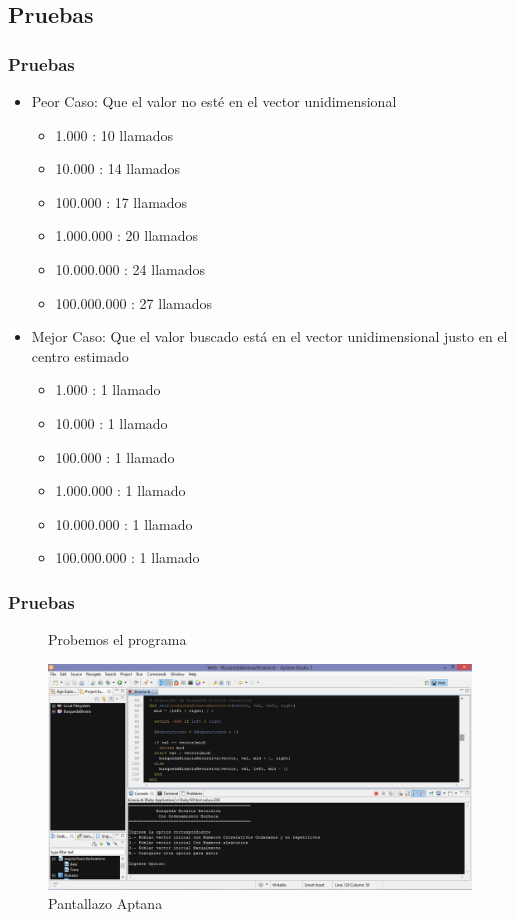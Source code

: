 \documentclass{beamer}
\begin{document}
	\subsection{Pruebas}
		
	\begin{frame}
		\frametitle{Pruebas}
			\begin{itemize}[<+->]		
				\item Peor Caso: Que el valor no esté en el vector unidimensional
					\begin{itemize}[<+->]

\item 1.000			: 10 llamados
\item10.000			: 14 llamados
\item100.000		: 17 llamados
\item1.000.000		: 20 llamados
\item10.000.000		: 24 llamados
\item100.000.000		: 27 llamados
					\end{itemize}
				
				\item Mejor Caso: Que el valor buscado está en el vector unidimensional justo en el centro estimado
					\begin{itemize}[<+->]

\item 1.000			: 1 llamado
\item 10.000			: 1 llamado
\item 100.000		: 1 llamado
\item 1.000.000		: 1 llamado
\item 10.000.000		: 1 llamado
\item 100.000.000		: 1 llamado

					\end{itemize}
			\end{itemize}

  				
	\end{frame}

	\begin{frame}
		\frametitle{Pruebas}
		\begin{figure}
			\begin{center}
				Probemos el programa 
			\end{center}
  				\centering
    			           \includegraphics[scale=0.25]{Programa.png}
  				\caption{Pantallazo Aptana}
  				\label{fig:lls}
			\end{figure}	
	\end{frame}
\end{document}

